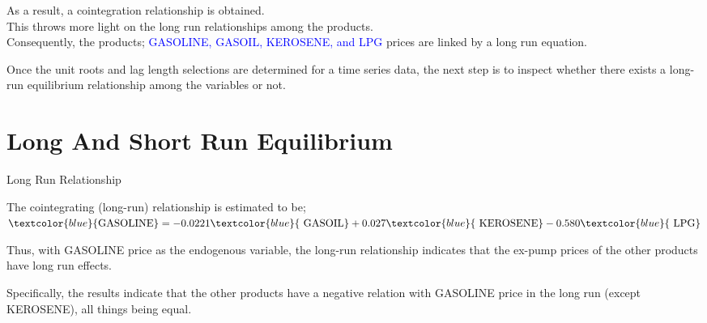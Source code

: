 \documentclass{beamer}
\newcommand{\colorPrimary}{blue}
\newcommand{\textPrimary}[1]{\textcolor{\colorPrimary}{#1}}
\newcommand{\vspaceFive}{\vspace{5pt}}
\newcommand{\vspaceTen}{\vspace{10pt}}
\begin{document}
	\begin{frame}
		\begin{block}{}
			As a result, a cointegration relationship is obtained. \\ 
			This throws more light on the long run relationships among the products.\\
			 Consequently, the products; \textPrimary{GASOLINE, GASOIL, KEROSENE, and LPG} prices are linked by a 
			long run equation. 
		\end{block}
	
		\begin{block}{}
			Once the unit roots and lag length selections are determined for a time series data, the next step is to inspect whether there exists a long-run equilibrium relationship among the variables or not.
		\end{block}
	\end{frame}
		
	
	\section{Long And Short Run Equilibrium}
	\begin{frame}{Long Run Relationship}
		\begin{block}{The cointegrating (long-run) relationship is estimated to be;}
			\vspaceFive
			\begin{math}
				\textPrimary{\text{GASOLINE}} = 
				- 0.0221 \textPrimary{\text{ GASOIL}} + 
				0.027 \textPrimary{\text{ KEROSENE}} - 
				0.580 \textPrimary{\text{ LPG}}
			\end{math}
			
			\vspaceFive 
		\end{block} 
		\vspaceFive
		
		Thus, with GASOLINE price as the endogenous variable, the long-run relationship indicates that the ex-pump prices of the other products have long run effects. \\ \vspaceTen
		
		Specifically, the results indicate that the other products have a negative relation with GASOLINE price in the long run (except KEROSENE), all things being equal.
	\end{frame}
\end{document}
